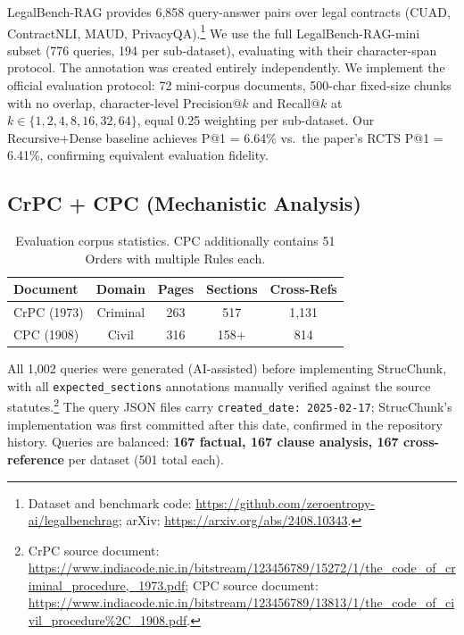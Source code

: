 \documentclass[sn-mathphys,Numbered]{sn-jnl}%
\begin{document}
LegalBench-RAG \cite{pipitone2024legalbenchragbenchmarkretrievalaugmentedgeneration} provides 6,858
query-answer pairs over legal contracts (CUAD, ContractNLI, MAUD,
PrivacyQA).\footnote{Dataset and benchmark code:
  \url{https://github.com/zeroentropy-ai/legalbenchrag};
  arXiv: \url{https://arxiv.org/abs/2408.10343}.}
We use the full LegalBench-RAG-mini subset (776 queries, 194
per sub-dataset), evaluating with their character-span protocol.  The
annotation was created entirely independently.  We implement the official
evaluation protocol: 72 mini-corpus documents, 500-char fixed-size chunks
with no overlap, character-level Precision@$k$ and Recall@$k$ at
$k\in\{1,2,4,8,16,32,64\}$, equal 0.25 weighting per sub-dataset.  Our
Recursive+Dense baseline achieves P@1 = 6.64\% vs.\ the paper's RCTS
P@1 = 6.41\%, confirming equivalent evaluation fidelity.

\subsection{CrPC + CPC (Mechanistic Analysis)}

\begin{table}[htbp]
\centering
\begin{tabular}{lcccc}
\toprule
\textbf{Document} & \textbf{Domain} & \textbf{Pages}
                  & \textbf{Sections} & \textbf{Cross-Refs} \\
\midrule
CrPC (1973) & Criminal & 263 & 517   & 1,131 \\
CPC (1908)  & Civil    & 316 & 158+  & 814   \\
\bottomrule
\end{tabular}
\caption{Evaluation corpus statistics.  CPC additionally contains 51
  Orders with multiple Rules each.}
\label{tab:corpus}
\end{table}

All 1,002 queries were generated (AI-assisted) before implementing
StrucChunk, with all \texttt{expected\_sections} annotations manually
verified against the source statutes.\footnote{%
  CrPC source document:
  \url{https://www.indiacode.nic.in/bitstream/123456789/15272/1/the_code_of_criminal_procedure,_1973.pdf};
  CPC source document:
  \url{https://www.indiacode.nic.in/bitstream/123456789/13813/1/the_code_of_civil_procedure\%2C_1908.pdf}.}
The query JSON files carry
\texttt{created\_date: 2025-02-17}; StrucChunk's implementation was first
committed after this date, confirmed in the repository history.  Queries
are balanced: \textbf{167 factual, 167 clause analysis, 167 cross-reference}
per dataset (501 total each).
\end{document}
